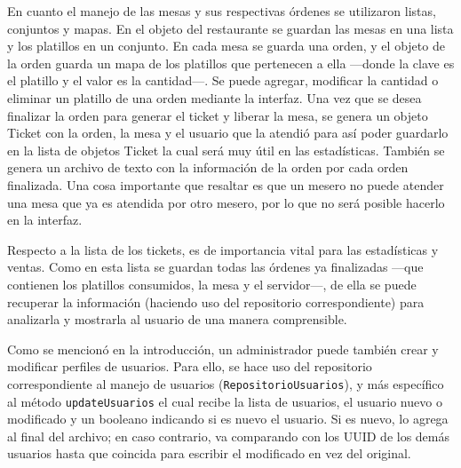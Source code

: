 En cuanto el manejo de las mesas y sus respectivas órdenes se utilizaron listas, conjuntos y mapas. En el
objeto del restaurante se guardan las mesas en una lista y los platillos en un conjunto. En cada mesa se
guarda una orden, y el objeto de la orden guarda un mapa de los platillos que pertenecen a ella ---donde la 
clave es el platillo y el valor es la cantidad---. Se puede agregar, modificar la cantidad o eliminar un platillo
de una orden mediante la interfaz. Una vez que se desea finalizar la orden para generar el ticket y liberar la mesa,
se genera un objeto Ticket con la orden, la mesa y el usuario que la atendió para así poder guardarlo en la lista de
objetos Ticket la cual será muy útil en las estadísticas. También se genera un archivo de texto con la información de
la orden por cada orden finalizada. Una cosa importante que resaltar es que un mesero no puede atender una mesa que
ya es atendida por otro mesero, por lo que no será posible hacerlo en la interfaz.

Respecto a la lista de los tickets, es de importancia vital para las estadísticas y ventas. Como en esta lista se guardan
todas las órdenes ya finalizadas ---que contienen los platillos consumidos, la mesa y el servidor---, de ella se puede
recuperar la información (haciendo uso del repositorio correspondiente) para analizarla y mostrarla al usuario de una manera
comprensible.

Como se mencionó en la introducción, un administrador puede también crear y modificar perfiles de usuarios. Para ello, se hace
uso del repositorio correspondiente al manejo de usuarios (\texttt{RepositorioUsuarios}), y más específico al método \texttt{updateUsuarios}
el cual recibe la lista de usuarios, el usuario nuevo o modificado y un booleano indicando si es nuevo el usuario. Si es nuevo,
lo agrega al final del archivo; en caso contrario, va comparando con los UUID de los demás usuarios hasta que coincida para
escribir el modificado en vez del original.
\pagebreak